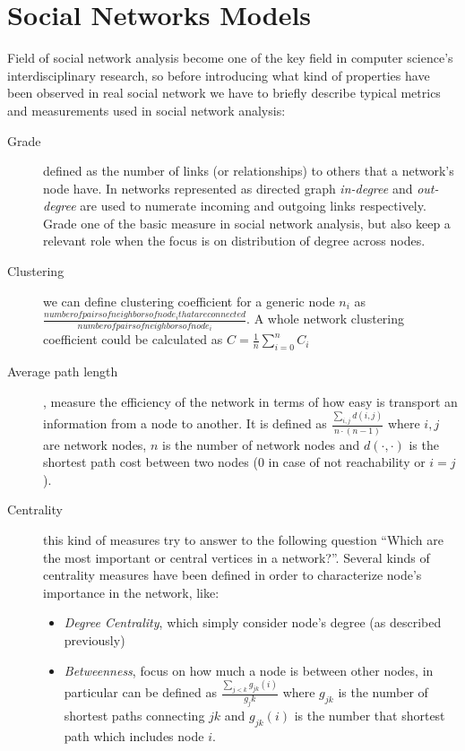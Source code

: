 \section{Social Networks Models}
\label{social_networks}

Field of social network analysis become one of the key field in  computer science's interdisciplinary research, so before introducing what kind of properties have been observed in real social network we have to briefly describe typical metrics and measurements used in social network analysis:
\begin{description}
\item [Grade] defined as the number of links (or relationships) to others that a network's node have\cite{newman:2010}. In networks represented as directed graph \emph{in-degree} and \emph{out-degree} are used to numerate incoming and outgoing links respectively. Grade one of the basic measure in social network analysis, but also keep a relevant role when the focus is on distribution of degree across nodes.
\item [Clustering] we can define clustering coefficient for a generic node $n_{i}$ as $\frac{number of pairs of neighbors of node_{i} that are connected}{number of pairs of neighbors of node_{i}}$. A whole network clustering coefficient could be calculated as $C=\frac{1}{n} \sum_{i=0}^{n} C_{i}$ \cite{citeulike:1580006}
\item [Average path length], measure the efficiency of the network in terms of how easy is transport an information from a node to another. It is defined as $\frac{\sum_{i,j}{d(i,j)}}{n\cdot (n-1)}$ where $i,j$ are network nodes, $n$ is the number of network nodes and $d(\cdot,\cdot)$ is the shortest path cost between two nodes ($0$ in case of not reachability or $i=j$). 
\item [Centrality] this kind of measures try to answer to the following question ``Which are the most important or central vertices in a network?''. Several kinds of centrality measures have been defined in order to characterize node's importance in the network, like:
\begin{itemize}
\item \emph{Degree Centrality}, which simply consider node's degree (as described previously)
\item \emph{Betweenness}, focus on how much a node is between other nodes, in particular can be defined as $ \frac{\sum_{j<k}{g_{jk}(i)}}{g_jk }$ where $g_{jk}$ is the number of shortest paths connecting $jk$ and
$g_{jk}(i)$ is the number that shortest path which includes node $i$.

\end{itemize}
\end{description}
